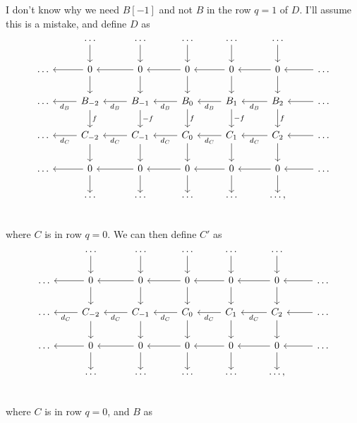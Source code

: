 \documentclass{article}
\theoremstyle{definition}
\begin{document}
I don't know why we need $B[-1]$ and not $B$ in the row $q = 1$ of 
$D$. I'll assume this is a mistake, and define $D$ as 
\[
\begin{tikzcd}
	& \ldots \arrow[d] 
	& \ldots \arrow[d]
	& \ldots \arrow[d] 
	& \ldots \arrow[d]
	& \ldots \arrow[d] 
	\\
	\ldots
	& 0 \arrow[l] \arrow[d] 
	& 0 \arrow[l] \arrow[d] 
	& 0 \arrow[l] \arrow[d] 
	& 0 \arrow[l] \arrow[d] 
	& 0 \arrow[l] \arrow[d] 
	& \ldots \arrow[l]
	\\
	\ldots
	& B_{-2} \arrow[l, "d_B"] \arrow[d, "f"]
	& B_{-1} \arrow[l, "d_B"] \arrow[d, "-f"]
	& B_{0} \arrow[l, "d_B"] \arrow[d, "f"]
	& B_{1} \arrow[l, "d_B"] \arrow[d, "-f"]
	& B_{2} \arrow[l, "d_B"] \arrow[d, "f"]
	& \ldots \arrow[l]
	\\
	\ldots
	& C_{-2} \arrow[l, "d_C"] \arrow[d] 
	& C_{-1} \arrow[l, "d_C"] \arrow[d] 
	& C_{0} \arrow[l, "d_C"] \arrow[d] 
	& C_{1} \arrow[l, "d_C"] \arrow[d] 
	& C_{2} \arrow[l, "d_C"] \arrow[d] 
	& \ldots \arrow[l]
	\\
	\ldots
	& 0 \arrow[l] \arrow[d] 
	& 0 \arrow[l] \arrow[d] 
	& 0 \arrow[l] \arrow[d] 
	& 0 \arrow[l] \arrow[d] 
	& 0 \arrow[l] \arrow[d] 
	& \ldots \arrow[l]
	\\
	& \ldots
	& \ldots
	& \ldots
	& \ldots
	& \ldots,
	\\
\end{tikzcd}
\] 
where $C$ is in row $q = 0$. We can then define $C'$
as
\[
\begin{tikzcd}
	& \ldots \arrow[d] 
	& \ldots \arrow[d]
	& \ldots \arrow[d] 
	& \ldots \arrow[d]
	& \ldots \arrow[d] 
	\\
	\ldots
	& 0 \arrow[l] \arrow[d] 
	& 0 \arrow[l] \arrow[d] 
	& 0 \arrow[l] \arrow[d] 
	& 0 \arrow[l] \arrow[d] 
	& 0 \arrow[l] \arrow[d] 
	& \ldots \arrow[l]
	\\
	\ldots
	& C_{-2} \arrow[l, "d_C"] \arrow[d] 
	& C_{-1} \arrow[l, "d_C"] \arrow[d] 
	& C_{0} \arrow[l, "d_C"] \arrow[d] 
	& C_{1} \arrow[l, "d_C"] \arrow[d] 
	& C_{2} \arrow[l, "d_C"] \arrow[d] 
	& \ldots \arrow[l]
	\\
	\ldots
	& 0 \arrow[l] \arrow[d] 
	& 0 \arrow[l] \arrow[d] 
	& 0 \arrow[l] \arrow[d] 
	& 0 \arrow[l] \arrow[d] 
	& 0 \arrow[l] \arrow[d] 
	& \ldots \arrow[l]
	\\
	& \ldots
	& \ldots
	& \ldots
	& \ldots
	& \ldots,
	\\
\end{tikzcd}
\]
where $C$ is in row $q = 0$, and $B$ as 
\end{document}
